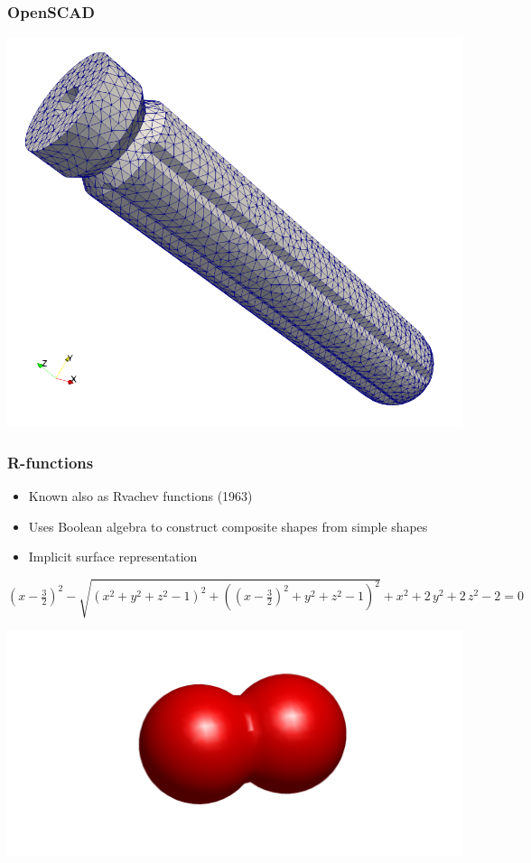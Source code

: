 \documentclass{beamer}
\begin{document}
\begin{frame}
\frametitle{OpenSCAD}
\centerline{\includegraphics[scale = 0.3]{./figs/sdh_mesh}}
\end{frame}

\begin{frame}[t]
\frametitle{R-functions}
\begin{itemize}
\item Known also as Rvachev functions (1963)
\item Uses Boolean algebra to construct composite shapes from simple shapes
\item Implicit surface representation
\end{itemize}
${\left(x-\frac{3}{2}\right)}^2-\sqrt{{\left(x^2+y^2+z^2-1\right)}^2+{\left({\left(x-\frac{3}{2}\right)}^2+y^2+z^2-1\right)}^2}+x^2+2\,y^2+2\,z^2-2 = 0$
\centerline{\includegraphics[width = 0.75\linewidth]{./figs/TwoSpheres}}
\end{frame}
\end{document}
